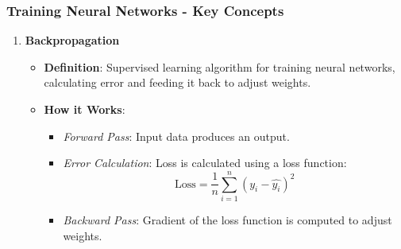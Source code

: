 \documentclass[aspectratio=169]{beamer}
\begin{document}
\begin{frame}[fragile]
    \frametitle{Training Neural Networks - Key Concepts}
    \begin{enumerate}
        \item \textbf{Backpropagation}
            \begin{itemize}
                \item \textbf{Definition}: Supervised learning algorithm for training neural networks, calculating error and feeding it back to adjust weights.
                \item \textbf{How it Works}:
                    \begin{itemize}
                        \item \textit{Forward Pass}: Input data produces an output.
                        \item \textit{Error Calculation}: Loss is calculated using a loss function:
                          \[
                          \text{Loss} = \frac{1}{n} \sum_{i=1}^{n} (y_i - \hat{y_i})^2
                          \]
                        \item \textit{Backward Pass}: Gradient of the loss function is computed to adjust weights.
                    \end{itemize}
            \end{itemize}
    \end{enumerate}
\end{frame}
\end{document}
